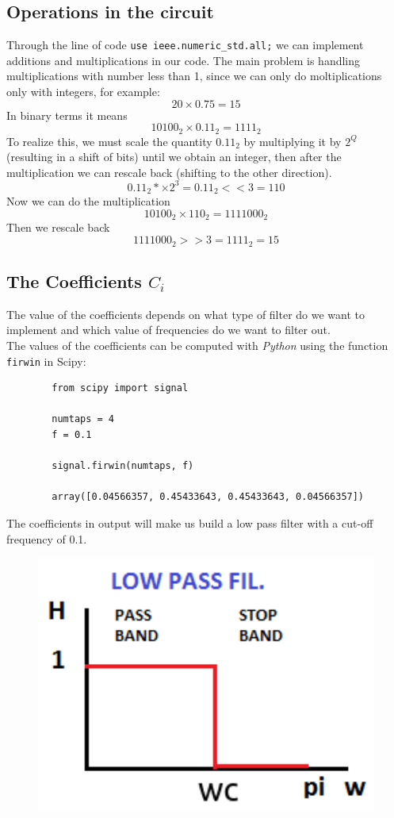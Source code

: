 \documentclass[11pt,a4paper,twocolumn]{IEEEtran}
\begin{document}
		\subsection*{Operations in the circuit} Through the line of code
		\texttt{use ieee.numeric\_std.all;} we can implement additions and multiplications in our code. The main problem is handling multiplications with number less than 1, since we can only do moltiplications only with integers, for example: $$20\times 0.75 = 15$$ In binary terms it means
		$$ 10100_2 \times 0.11_2 = 1111_2$$
		To realize this, we must scale the quantity $0.11_2$ by multiplying it by $2^Q$ (resulting in a shift of bits) until we obtain an integer, then after the multiplication we can rescale back (shifting to the other direction).
		$$0.11_2 *\times 2^3 = 0.11_2 <<3 = 110$$
		Now we can do the multiplication
		$$10100_2\times 110_2 = 1111000_2$$
		Then we rescale back
		$$1111000_2 >> 3 = 1111_2 = 15$$
		\subsection*{The Coefficients $C_i$}
		The value of the coefficients depends on what type of filter do we want to implement and which value of frequencies do we want to filter out.\\
		The values of the coefficients can be computed with \emph{Python} using the function \texttt{firwin} in Scipy:\\
		\begin{lstlisting}
		from scipy import signal
		
		numtaps = 4
		f = 0.1
		
		signal.firwin(numtaps, f)
		
		array([0.04566357, 0.45433643, 0.45433643, 0.04566357])
		\end{lstlisting}
		The coefficients in output will make us build a low pass filter with a cut-off frequency of 0.1.
		\begin{figure}[h]
			\centering
			\includegraphics[width=0.7\linewidth]{img/lowpass}
		\end{figure}
\end{document}
